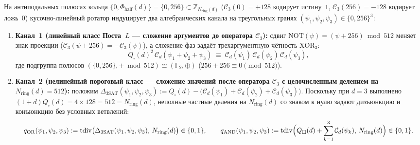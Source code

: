 \documentclass[11pt,a4paper]{article}
\theoremstyle{plain}
\theoremstyle{definition}
\begin{document}
На антиподальных полюсах кольца $\{0,\Phi_{\mathrm{half}}(d)\}=\{0,256\}\subset\mathbb{Z}_{N_{\mathrm{ring}}(d)}$ ($\mathcal{C}_3(0)=+128$ кодирует истину~$1$, $\mathcal{C}_3(256)=-128$ кодирует ложь~$0$) кусочно-линейный ротатор индуцирует два алгебраических канала на треугольных гранях $(\psi_1,\psi_2,\psi_3)\in\{0,256\}^3$:
\begin{enumerate}[leftmargin=*,noitemsep]
\item \textbf{Канал~1 (линейный класс Поста~$L$ --- сложение аргументов до оператора $\mathcal{C}_3$):}
  сдвиг $\mathrm{NOT}(\psi)=(\psi+256)\bmod 512$ меняет знак проекции ($\mathcal{C}_3(\psi+256)=-\mathcal{C}_3(\psi)$), а сложение фаз задаёт трехаргументную чётность $\mathrm{XOR}_3$:
  \begin{equation}
    \label{eq:pre-rotator-xor}
    Q_\square(d)^2\,\mathcal{C}_d(\psi_1+\psi_2+\psi_3) \;\equiv\; \mathcal{C}_d(\psi_1)\,\mathcal{C}_d(\psi_2)\,\mathcal{C}_d(\psi_3),
  \end{equation}
  где подгруппа полюсов $(\{0,256\},+\bmod 512)\cong(\mathbb{F}_2,\oplus)$ ($256+256\equiv 0\pmod{512}$).
\item \textbf{Канал~2 (нелинейный пороговый класс --- сложение значений после оператора $\mathcal{C}_3$ с целочисленным делением на $N_{\mathrm{ring}}(d)=512$):}
  положим $\Delta_{\mathrm{3SAT}}(\psi_1,\psi_2,\psi_3) := Q_\square(d)-\bigl(\mathcal{C}_d(\psi_1)+\mathcal{C}_d(\psi_2)+\mathcal{C}_d(\psi_3)\bigr)$. Поскольку при $d=3$ выполнено $(1+d)Q_\square(d)=4\times 128=512=N_{\mathrm{ring}}(d)$, неполные частные деления на $N_{\mathrm{ring}}(d)$ со знаком к нулю задают дизъюнкцию и конъюнкцию без условных ветвлений:
  \begin{equation}
    \label{eq:post-rotator-or-and}
    q_{\mathrm{OR}}(\psi_1,\psi_2,\psi_3) := \mathrm{tdiv}\bigl(\Delta_{\mathrm{3SAT}}(\psi_1,\psi_2,\psi_3),\,N_{\mathrm{ring}}(d)\bigr)\in\{0,1\},\qquad
    q_{\mathrm{AND}}(\psi_1,\psi_2,\psi_3) := \mathrm{tdiv}\Bigl(Q_\square(d)+\sum_{k=1}^3\mathcal{C}_d(\psi_k),\,N_{\mathrm{ring}}(d)\Bigr)\in\{0,1\}.
  \end{equation}
\end{enumerate}
\end{document}
